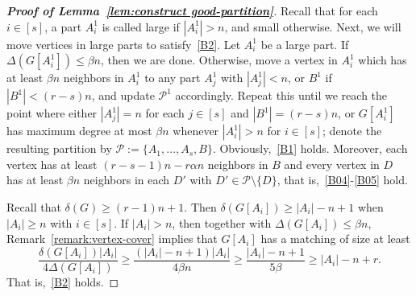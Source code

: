 \documentclass[11pt, a4paper]{article}
\theoremstyle{definition}
\newcommand{\<}{\subseteq}
\newcommand{\de}{\delta}
\begin{document}
\begin{proof}[{\bf Proof of Lemma~\ref{lem:construct good-partition}}]
Recall that for each $i \in [s]$, a part $A_i^1$ is called {large} if $|A_i^1| > n$, and {small} otherwise. 
Next, we will move vertices in large parts to satisfy~\ref{B2}.  
Let $A_i^1$ be a large part. %
If $\Delta(G[A_i^1])\leq \beta n$, then we are done. Otherwise, move a vertex in \(A_i^1\) which has at least \( \beta n \) neighbors in \(A_i^1\) to any part \(A_j^1\) with $|A_j^1|<n$, or $B^1$ if $|B^1|<(r-s)n$, and update \(\mathcal{P}^1\) accordingly. %
Repeat this until we reach the point {where} either $|A_j^1|=n$ for each $j\in [s]$ and $|B^1|=(r-s)n$, or $G[A_i^1]$ has maximum degree at most $\beta n$ whenever $|A_i^1|>n$ for $i\in [s]$; denote the resulting partition by $\mathcal{P}:=\{A_1,\ldots,A_s,B\}$. 
Obviously,~\ref{B1} holds. Moreover,  each vertex has  at least $(r-s-1)n-r\alpha n$ neighbors in $B$ and every vertex in $D$ has at least $\beta n$ neighbors in each $D'$ with $D'\in \mathcal{P}\setminus \{D\}$, that is,~\ref{B04}-\ref{B05} hold.

Recall that $\de(G)\geq (r-1)n+1$. Then $\de(G[A_i])\geq |A_i|-n+1$ when $|A_i|\geq n$ with $i\in [s]$.  %
If $|A_i|>n$, then together with $\Delta(G[A_i])\leq \beta n$, Remark~\ref{remark:vertex-cover} implies that $G[A_i]$ has a matching of size at least
$$
\frac{\de(G[A_i])|A_i|}{4\Delta(G[A_i])}\geq \frac{(|A_i|-n+1)|A_i|}{4\beta n}\geq \frac{|A_i|-n+1}{5\beta}\ge |A_i|-n+r.
$$
That is,~\ref{B2} holds. 


\end{proof}
\end{document}
